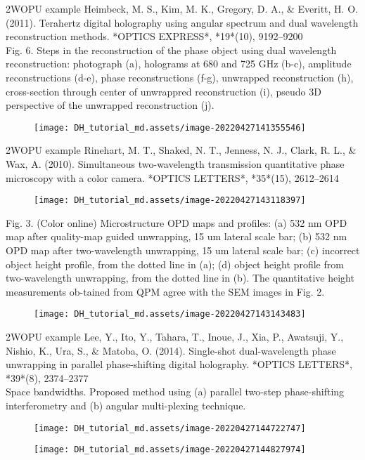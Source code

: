 \documentclass[t, aspectratio=169]{beamer}
\begin{document}
\begin{frame}{2WOPU example}
Heimbeck, M. S., Kim, M. K., Gregory, D. A., \& Everitt, H. O. (2011). Terahertz digital holography using angular spectrum and dual wavelength reconstruction methods. *OPTICS EXPRESS*, *19*(10), 9192–9200 \\
Fig.  6.  Steps  in  the  reconstruction  of  the  phase  object  using  dual  wavelength  reconstruction: photograph  (a),  holograms  at  680  and  725  GHz  (b-c),  amplitude  reconstructions  (d-e),  phase reconstructions   (f-g),   unwrapped   reconstruction   (h),   cross-section   through   center   of unwrappred reconstruction (i), pseudo 3D perspective of the unwrapped reconstruction (j).
\begin{figure}
	\texttt{[image: DH\_tutorial\_md.assets/image-20220427141355546]}
\end{figure}
\end{frame}


\begin{frame}[allowframebreaks]{2WOPU example}
Rinehart, M. T., Shaked, N. T., Jenness, N. J., Clark, R. L., \& Wax, A. (2010). Simultaneous two-wavelength transmission quantitative phase microscopy with a color camera. *OPTICS LETTERS*, *35*(15), 2612–2614
\begin{figure}
	\texttt{[image: DH\_tutorial\_md.assets/image-20220427143118397]}
\end{figure}
Fig. 3. (Color online) Microstructure OPD maps and profiles: (a) 532 nm OPD map after quality-map guided unwrapping, 15 um lateral scale bar; (b) 532 nm OPD map after two-wavelength unwrapping, 15 um lateral scale bar; (c) incorrect object height profile, from the dotted line in (a); (d) object height profile from two-wavelength unwrapping, from the dotted line in (b). The quantitative height measurements ob-tained from QPM agree with the SEM images in Fig. 2.
\begin{figure}
	\texttt{[image: DH\_tutorial\_md.assets/image-20220427143143483]}
\end{figure}
\end{frame}


\begin{frame}[allowframebreaks]{2WOPU example}
Lee, Y., Ito, Y., Tahara, T., Inoue, J., Xia, P., Awatsuji, Y., Nishio, K., Ura, S., \& Matoba, O. (2014). Single-shot dual-wavelength phase unwrapping in parallel phase-shifting digital holography. *OPTICS LETTERS*, *39*(8), 2374–2377 \\
Space bandwidths. Proposed method using (a) parallel two-step phase-shifting interferometry and (b) angular multi-plexing technique.
\begin{figure}
	\texttt{[image: DH\_tutorial\_md.assets/image-20220427144722747]}
\end{figure}
\begin{figure}
	\texttt{[image: DH\_tutorial\_md.assets/image-20220427144827974]}
\end{figure}
\end{frame}
\end{document}
